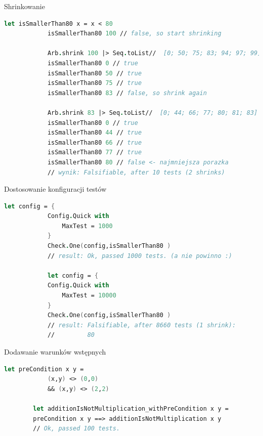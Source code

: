     \begin{frame}[fragile]{Shrinkowanie}
        \begin{lstlisting}[language=FSharp, xleftmargin=-10pt,xrightmargin=-10pt,numbers=none,basicstyle=\ttfamily\small]
            let isSmallerThan80 x = x < 80
            isSmallerThan80 100 // false, so start shrinking

            Arb.shrink 100 |> Seq.toList//  [0; 50; 75; 83; 94; 97; 99]
            isSmallerThan80 0 // true
            isSmallerThan80 50 // true
            isSmallerThan80 75 // true
            isSmallerThan80 83 // false, so shrink again

            Arb.shrink 83 |> Seq.toList//  [0; 44; 66; 77; 80; 81; 83]
            isSmallerThan80 0 // true
            isSmallerThan80 44 // true
            isSmallerThan80 66 // true
            isSmallerThan80 77 // true
            isSmallerThan80 80 // false <- najmniejsza porazka
            // wynik: Falsifiable, after 10 tests (2 shrinks)
        \end{lstlisting}
    \end{frame}
    
    \begin{frame}[fragile]{Dostosowanie konfiguracji testów}
    \begin{lstlisting}[language=FSharp, xleftmargin=-10pt,xrightmargin=-10pt,numbers=none]
        let config = {
            Config.Quick with
                MaxTest = 1000
            }
            Check.One(config,isSmallerThan80 )
            // result: Ok, passed 1000 tests. (a nie powinno :)
            
            let config = {
            Config.Quick with
                MaxTest = 10000
            }
            Check.One(config,isSmallerThan80 )
            // result: Falsifiable, after 8660 tests (1 shrink):
            //         80
    \end{lstlisting}
    \end{frame}
    
    \begin{frame}[fragile]{Dodawanie warunków wstępnych}
    \begin{lstlisting}[language=FSharp, xleftmargin=-10pt,xrightmargin=-10pt,numbers=none]
        let preCondition x y =
            (x,y) <> (0,0)
            && (x,y) <> (2,2)
    
        let additionIsNotMultiplication_withPreCondition x y =
        preCondition x y ==> additionIsNotMultiplication x y
        // Ok, passed 100 tests.
    \end{lstlisting}
    \end{frame}
    
